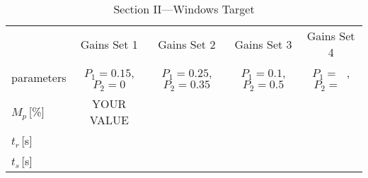 \documentclass{article}
\begin{document}
\begin{table}[phtb]\footnotesize 
\begin{center}
\caption{Section II---Windows Target}
\label{tbl:lab5_q1_3}
\begin{tabular}{l|m{1.2cm}|m{1.2cm}|m{1.2cm}|m{1.2cm}|m{1.2cm}|m{1.2cm}|m{1.2cm}|m{1.2cm}} \hline \hline
\cellcolor{lightgray} & \multicolumn{2}{c|}{\cellcolor{lightgray}Gains Set 1} & \multicolumn{2}{c|}{\cellcolor{lightgray}Gains Set 2} & \multicolumn{2}{c|}{\cellcolor{lightgray}Gains Set 3} & \multicolumn{2}{c}{\cellcolor{lightgray}Gains Set 4}\\ \cline{2-9}
\multirow{-2}{*}{\cellcolor{lightgray}parameters}& \multicolumn{2}{c|}{$P_1 = 0.15$, $P_2 = 0$}& \multicolumn{2}{c|}{$P_1 = 0.25$, $P_2 = 0.35$}& \multicolumn{2}{c|}{$P_1 = 0.1$, $P_2 = 0.5$}& \multicolumn{2}{c}{$P_1 = ~~~$, $P_2 = ~~~$}\\ \hline
$M_p$\,[\%]& \multicolumn{2}{c|}{YOUR VALUE} & \multicolumn{2}{c|}{~} & \multicolumn{2}{c|}{~} & \multicolumn{2}{c}{~} \\ \hline
$t_r$\,[\si{\second}] & \multicolumn{2}{c|}{} & \multicolumn{2}{c|}{} & \multicolumn{2}{c|}{} & \multicolumn{2}{c}{} \\ \hline
$t_s$\,[\si{\second}] & \multicolumn{2}{c|}{} & \multicolumn{2}{c|}{} & \multicolumn{2}{c|}{} & \multicolumn{2}{c}{} \\ \hline
\end{tabular}
\end{center}
\end{table}
\end{document}
